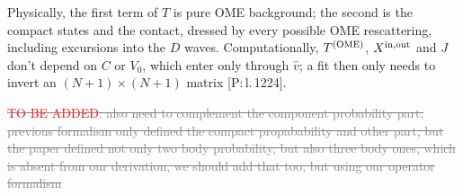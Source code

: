 \documentclass[11pt]{article}
\newcommand{\todo}{\textcolor{red}{TO BE ADDED}}
\newcommand{\tagP}[1]{\textcolor{blue!65!black}{\textsf{\small[P:\,#1]}}}
\newcommand{\aifix}[2]{\textcolor{gray}{\sout{#1}} \textcolor{aicolor}{#2}}
\newcommand{\aifix}[2]{#2}
\newenvironment{aiadd}{\par}{\par}
\begin{document}
\begin{aiadd}
	Physically, the first term of $T$ is pure OME background; the second is the compact states and the contact, dressed by every possible OME rescattering, including excursions into the $D$ waves. Computationally, $T^{\rm (OME)}$, $X^{\rm in,out}$ and $J$ don't depend on $C$ or $V_0$, which enter only through $\hat v$; a fit then only needs to invert an $(N+1)\times(N+1)$ matrix \tagP{l.\,1224}.
\end{aiadd}



\aifix{\todo: also need to complement the component probability part, previous formalism only defined the compact propabability and other part, but the paper defined not only two body probability, but also three body ones, which is absent from our derivation, we should add that too, but using our operator formalism}{}
\end{document}
